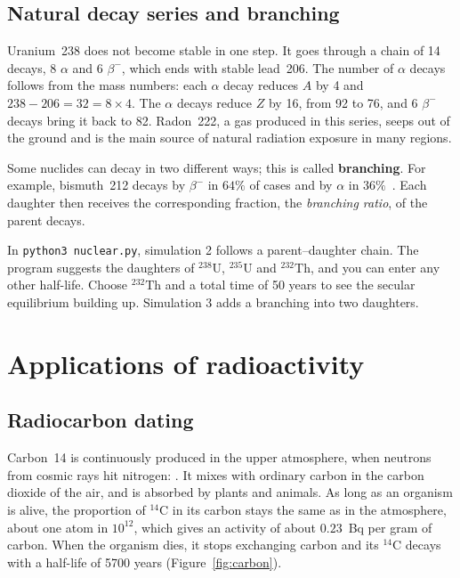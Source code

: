 \documentclass[11pt,a4paper]{article}
\newcommand{\iso}[2]{\ensuremath{{}^{#1}\mathrm{#2}}}         %
\begin{document}
\subsection{Natural decay series and branching}

Uranium~238 does not become stable in one step. It goes through a chain of 14 decays, 8 $\alpha$ and 6 $\beta^-$, which ends with stable lead~206. The number of $\alpha$ decays follows from the mass numbers: each $\alpha$ decay reduces $A$ by 4 and $238 - 206 = 32 = 8 \times 4$. The $\alpha$ decays reduce $Z$ by 16, from 92 to 76, and 6 $\beta^-$ decays bring it back to 82. Radon~222, a gas produced in this series, seeps out of the ground and is the main source of natural radiation exposure in many regions.

Some nuclides can decay in two different ways; this is called \textbf{branching}. For example, bismuth~212 decays by $\beta^-$ in $64\%$ of cases and by $\alpha$ in $36\%$~\cite{NUBASE2020}. Each daughter then receives the corresponding fraction, the \emph{branching ratio}, of the parent decays.

\begin{codebox}
In \texttt{python3 nuclear.py}, simulation 2 follows a parent--daughter chain. The program suggests the daughters of \iso{238}{U}, \iso{235}{U} and \iso{232}{Th}, and you can enter any other half-life. Choose \iso{232}{Th} and a total time of 50 years to see the secular equilibrium building up. Simulation 3 adds a branching into two daughters.
\end{codebox}

\section{Applications of radioactivity}

\subsection{Radiocarbon dating}

Carbon~14 is continuously produced in the upper atmosphere, when neutrons from cosmic rays hit nitrogen: . It mixes with ordinary carbon in the carbon dioxide of the air, and is absorbed by plants and animals. As long as an organism is alive, the proportion of \iso{14}{C} in its carbon stays the same as in the atmosphere, about one atom in $10^{12}$, which gives an activity of about $0.23$~Bq per gram of carbon. When the organism dies, it stops exchanging carbon and its \iso{14}{C} decays with a half-life of 5700 years (Figure~\ref{fig:carbon}).
\end{document}
